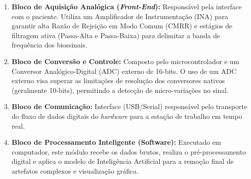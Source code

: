 \documentclass[tcc,capa]{texufpel}
\begin{document}
\begin{enumerate}
    \item \textbf{Bloco de Aquisição Analógica (\textit{Front-End}):} Responsável pela interface com o paciente. Utiliza um Amplificador de Instrumentação (INA) para garantir alta Razão de Rejeição em Modo Comum (CMRR) e estágios de filtragem ativa (Passa-Alta e Passa-Baixa) para delimitar a banda de frequência dos biossinais.
      
    \item \textbf{Bloco de Conversão e Controle:} Composto pelo microcontrolador e um Conversor Analógico-Digital (ADC) externo de 16-bits. O uso de um ADC externo visa superar as limitações de resolução dos conversores nativos (geralmente 10-bits), permitindo a detecção de micro-variações no sinal.
    
    \item \textbf{Bloco de Comunicação:} Interface (USB/Serial) responsável pelo transporte do fluxo de dados digitais do \textit{hardware} para a estação de trabalho em tempo real.
    
    \item \textbf{Bloco de Processamento Inteligente (Software):} Executado em computador, este módulo recebe os dados brutos, realiza o pré-processamento digital e aplica o modelo de Inteligência Artificial para a remoção final de artefatos complexos e visualização gráfica.
\end{enumerate}
\end{document}
